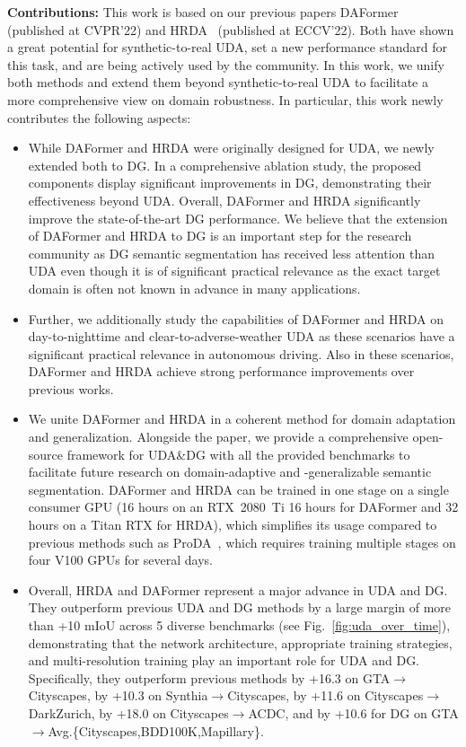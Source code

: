 \documentclass[journal,compsoc]{IEEEtran}
\begin{document}
\noindent\textbf{Contributions:}
This work is based on our previous papers DAFormer~\cite{hoyer2021daformer} (published at CVPR'22) and HRDA~\cite{hoyer2022hrda} (published at ECCV'22). Both have shown a great potential for synthetic-to-real UDA, set a new performance standard for this task, and are being actively used by the community. In this work, we unify both methods  and extend them beyond synthetic-to-real UDA to facilitate a more comprehensive view on domain robustness. In particular, this work newly contributes the following aspects:

\begin{itemize}
    \item While DAFormer and HRDA were originally designed for UDA, we newly extended both to DG. In a comprehensive ablation study, the proposed components display significant improvements in DG, demonstrating their effectiveness beyond UDA. Overall, DAFormer and HRDA significantly improve the state-of-the-art DG performance. We believe that the extension of DAFormer and HRDA to DG is an important step for the research community as DG semantic segmentation has received less attention than UDA even though it is of significant practical relevance as the exact target domain is often not known in advance in many applications.
    \item Further, we additionally study the capabilities of DAFormer and HRDA on day-to-nighttime and clear-to-adverse-weather UDA as these scenarios have a significant practical relevance in autonomous driving. Also in these scenarios, DAFormer and HRDA achieve strong performance improvements over previous works.
    \item We unite DAFormer and HRDA in a coherent method for domain adaptation and generalization. Alongside the paper, we provide a comprehensive open-source framework for UDA\&DG with all the provided benchmarks to facilitate future research on domain-adaptive and -generalizable semantic segmentation. DAFormer and HRDA can be trained in one stage on a single consumer GPU (16 hours on an RTX~2080~Ti 16 hours for DAFormer and 32 hours on a Titan RTX for HRDA), which simplifies its usage compared to previous methods such as ProDA~\cite{zhang2021prototypical}, which requires training multiple stages on four V100 GPUs for several days.
    \item Overall, HRDA and DAFormer represent a major advance in UDA and DG. They outperform previous UDA and DG methods by a large margin of more than +10 mIoU across 5 diverse benchmarks (see Fig.~\ref{fig:uda_over_time}), demonstrating that the network architecture, appropriate training strategies, and multi-resolution training play an important role for UDA and DG.
    Specifically, they outperform previous methods by +16.3 on GTA$\rightarrow$Cityscapes, by +10.3 on Synthia$\rightarrow$Cityscapes, by +11.6 on Cityscapes$\to$DarkZurich, by +18.0 on Cityscapes$\to$ACDC, and by +10.6 for DG on GTA$\to$Avg.\{Cityscapes,BDD100K,Mapillary\}.
\end{itemize}
\end{document}
